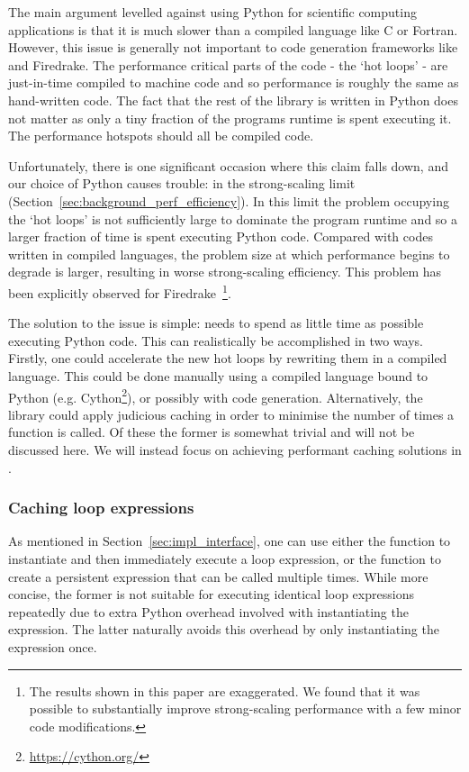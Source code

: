 The main argument levelled against using Python for scientific computing applications is that it is much slower than a compiled language like C or Fortran.
However, this issue is generally not important to code generation frameworks like  and Firedrake.
The performance critical parts of the code - the `hot loops' - are just-in-time compiled to machine code and so performance is roughly the same as hand-written code.
The fact that the rest of the library is written in Python does not matter as only a tiny fraction of the programs runtime is spent executing it.
The performance hotspots should all be compiled code.

Unfortunately, there is one significant occasion where this claim falls down, and our choice of Python causes trouble: in the strong-scaling limit (Section~\ref{sec:background_perf_efficiency}).
In this limit the problem occupying the `hot loops' is not sufficiently large to dominate the program runtime and so a larger fraction of time is spent executing Python code.
Compared with codes written in compiled languages, the problem size at which performance begins to degrade is larger, resulting in worse strong-scaling efficiency.
This problem has been explicitly observed for Firedrake~\cite{changComparativeStudyFinite2018}\footnote{The results shown in this paper are exaggerated. We found that it was possible to substantially improve strong-scaling performance with a few minor code modifications.}.

The solution to the issue is simple:  needs to spend as little time as possible executing Python code.
This can realistically be accomplished in two ways.
Firstly, one could accelerate the new hot loops by rewriting them in a compiled language.
This could be done manually using a compiled language bound to Python (e.g. Cython\footnote{\url{https://cython.org/}}), or possibly with code generation.
Alternatively, the library could apply judicious caching in order to minimise the number of times a function is called.
Of these the former is somewhat trivial and will not be discussed here.
We will instead focus on achieving performant caching solutions in .

\subsubsection{Caching loop expressions}

As mentioned in Section~\ref{sec:impl_interface}, one can use either the function  to instantiate and then immediately execute a loop expression, or the function  to create a persistent expression that can be called multiple times.
While more concise, the former is not suitable for executing identical loop expressions repeatedly due to extra Python overhead involved with instantiating the expression.
The latter naturally avoids this overhead by only instantiating the expression once.

